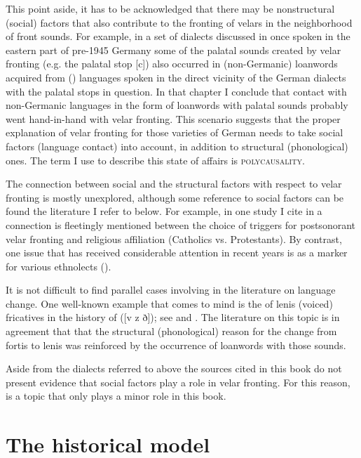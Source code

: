 \begin{xlist}
\begin{xlist}
This point aside, it has to be acknowledged that there may be nonstructural (social) factors that also contribute to the fronting of velars in the neighborhood of front sounds. For example, in a set of dialects discussed in  once spoken in the eastern part of pre-1945 Germany some of the palatal sounds created by velar fronting (e.g. the palatal stop [c]) also occurred in (non-Germanic) loanwords acquired from () languages spoken in the direct vicinity of the German dialects with the palatal stops in question. In that chapter I conclude that contact with non-Germanic languages in the form of  loanwords with palatal sounds probably went hand-in-hand with velar fronting. This scenario suggests that the proper explanation of velar fronting for those varieties of German needs to take social factors (language contact) into account, in addition to structural (phonological) ones. The term I use to describe this state of affairs is \textsc{polycausality}.

The connection between social and the structural factors with respect to velar fronting is mostly unexplored, although some reference to social factors can be found the literature I refer to below. For example, in one study I cite in  a connection is fleetingly mentioned between the choice of triggers for postsonorant velar fronting and religious affiliation (Catholics vs. Protestants). By contrast, one issue that has received considerable attention in recent years is  as a marker for various ethnolects ().

It is not difficult to find parallel cases involving  in the literature on language change. One well-known example that comes to mind is the  of lenis (voiced) fricatives in the history of  ([v z ð]); see  and . The literature on this topic is in agreement that that the structural (phonological) reason for the change from fortis to lenis was reinforced by the occurrence of  loanwords with those sounds.

Aside from the dialects referred to above the sources cited in this book do not present evidence that social factors play a role in velar fronting. For this reason,  is a topic that only plays a minor role in this book.

\section{The historical model}\label{sec:2.5}


\end{xlist}
\end{xlist}
